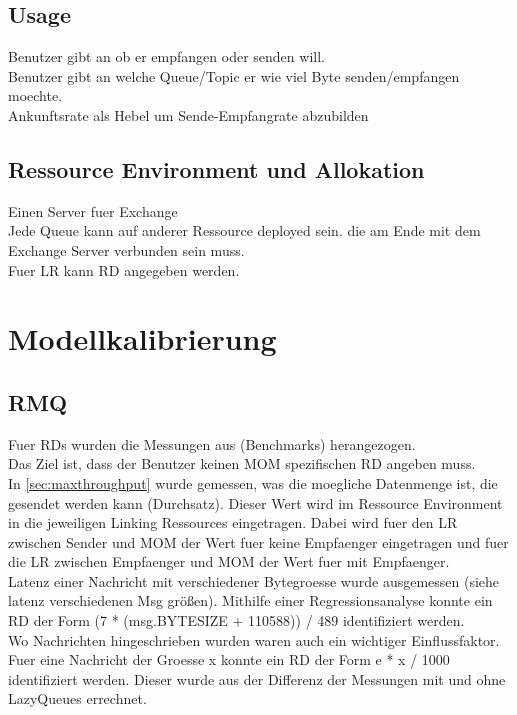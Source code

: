 \subsection{Usage}
Benutzer gibt an ob er empfangen oder senden will. \\
Benutzer gibt an welche Queue/Topic er wie viel Byte senden/empfangen moechte. \\
Ankunftsrate als Hebel um Sende-Empfangrate abzubilden \\
\subsection{Ressource Environment und Allokation}
Einen Server fuer Exchange \\
Jede Queue kann auf anderer Ressource deployed sein. die am Ende mit dem Exchange Server verbunden sein muss.\\
Fuer LR kann RD angegeben werden.

\section{Modellkalibrierung}
\subsection{RMQ}
\label{sec:rmqRd}
Fuer RDs wurden die Messungen aus (Benchmarks) herangezogen. \\ 
Das Ziel ist, dass der Benutzer keinen MOM spezifischen RD angeben muss. \\
In \autoref{sec:maxthroughput} wurde gemessen, was die moegliche Datenmenge ist, die gesendet werden kann (Durchsatz). Dieser Wert wird im Ressource Environment in die jeweiligen Linking Ressources eingetragen. Dabei wird fuer den LR zwischen Sender und MOM der Wert fuer keine Empfaenger eingetragen und fuer die LR zwischen Empfaenger und MOM der Wert fuer mit Empfaenger. \\

Latenz einer Nachricht mit verschiedener Bytegroesse wurde ausgemessen (siehe latenz verschiedenen Msg größen). Mithilfe einer Regressionsanalyse konnte ein RD der Form (7 * (msg.BYTESIZE + 110588)) / 489 identifiziert werden.\\

Wo Nachrichten hingeschrieben wurden waren auch ein wichtiger Einflussfaktor. Fuer eine Nachricht der Groesse x konnte ein RD der Form e * x / 1000 identifiziert werden. Dieser wurde aus der Differenz der Messungen mit und ohne LazyQueues errechnet. \\

